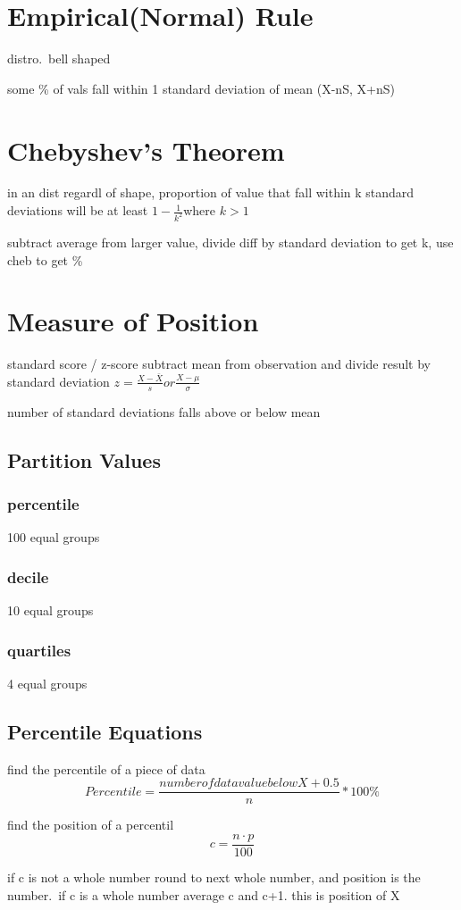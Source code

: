 \documentclass[11pt]{amsart}
\begin{document}
\section{Empirical(Normal) Rule}
\par distro.\ bell shaped
\par some \% of vals fall within 1 standard deviation of mean (X-nS, X+nS)
\section{Chebyshev's Theorem}
\par in an dist regardl of shape, proportion of value that fall within k standard deviations will be at least $1-\frac{1}{k^2}$where $k > 1$
\par subtract average from larger value, divide diff by standard deviation to get k, use cheb to get \%
\section{Measure of Position}
\par standard score / z-score subtract mean from observation and divide result by standard deviation $z = \frac {X - \bar{X}}{s}  or  \frac{X - \mu}{\sigma} $
\par number of standard deviations falls above or below mean
\subsection{Partition Values}
\subsubsection{percentile}
\par 100 equal groups
\subsubsection{decile}
\par 10 equal groups
\subsubsection{quartiles}
\par 4 equal groups
\subsection{Percentile Equations}
\par find the percentile of a piece of data
\begin{equation}
  Percentile = \frac{number of data value below X + 0.5}{n} * 100\%
\end{equation}
\par find the position of a percentil
\begin{equation}
  c = \frac{n \cdot p}{100}
\end{equation}
\par if c is not a whole number round to next whole number, and position is
the number.\ if c is a whole number average c and c+1. this is position of
X
\end{document}
